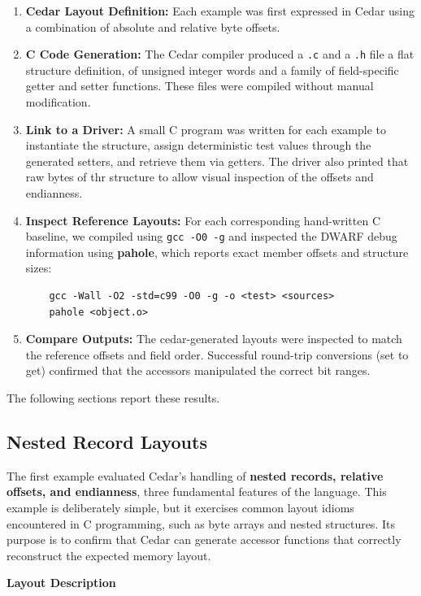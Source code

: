 \begin{enumerate}
    \item \textbf{Cedar Layout Definition:} Each example was first expressed
    in Cedar using a combination of absolute and relative byte offsets.
    \item \textbf{C Code Generation:} The Cedar compiler produced a \texttt{.c}
    and a \texttt{.h} file a flat structure definition, of unsigned integer
    words and a family of field-specific getter and setter functions.
    These files were compiled without manual modification.
    \item \textbf{Link to a Driver:} A small C program was written for
    each example to instantiate the structure, assign deterministic test
    values through the generated setters, and retrieve them via getters.
    The driver also printed that raw bytes of thr structure to allow
    visual inspection of the offsets and endianness.
    \item \textbf{Inspect Reference Layouts:} For each corresponding hand-written
    C baseline, we compiled using \texttt{gcc -O0 -g} and inspected
    the DWARF debug information using \textbf{pahole}, which reports exact
    member offsets and structure sizes:
   \begin{verbatim}
    gcc -Wall -O2 -std=c99 -O0 -g -o <test> <sources>
    pahole <object.o>
    \end{verbatim}
    \item \textbf{Compare Outputs:} The cedar-generated layouts
    were inspected to match the reference offsets and field order.
    Successful round-trip conversions (set to get) confirmed
    that the accessors manipulated the correct bit ranges.
\end{enumerate}

The following sections report these results.

\subsection{Nested Record Layouts}
The first example evaluated Cedar's handling of \textbf{nested records,
relative offsets, and endianness}, three fundamental features of the language.
This example is deliberately simple, but it exercises common layout idioms
encountered in C programming, such as byte arrays and nested structures.
Its purpose is to confirm that Cedar can generate accessor functions that
correctly reconstruct the expected memory layout.

\textbf{Layout Description}

